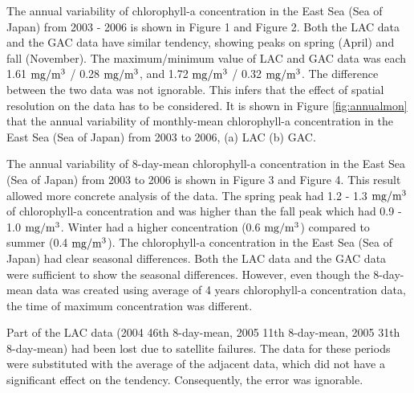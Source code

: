 The annual variability of chlorophyll-a concentration in the East Sea (Sea of Japan) from 2003 - 2006 is shown in Figure 1 and Figure 2. Both the LAC data and the GAC data have similar tendency, showing peaks on spring (April) and fall (November). The maximum/minimum value of LAC and GAC data was each 1.61 $\rm mg/m^3$ / 0.28 $\rm mg/m^3$, and 1.72 $\rm mg/m^3$ / 0.32 $\rm mg/m^3$. The difference between the two data was not ignorable. This infers that the effect of spatial resolution on the data has to be considered.
It is shown in Figure \ref{fig:annualmon} that the annual variability of monthly-mean chlorophyll-a concentration in the East Sea (Sea of Japan) from 2003 to 2006, (a) LAC (b) GAC.

 
 


  
  The annual variability of 8-day-mean chlorophyll-a concentration in the East Sea (Sea of Japan) from 2003 to 2006 is shown in Figure 3 and Figure 4. This result allowed more concrete analysis of the data. The spring peak had 1.2 - 1.3 $\rm mg/m^3$ of chlorophyll-a concentration and was higher than the fall peak which had 0.9 - 1.0 $\rm mg/m^3$. Winter had a higher concentration (0.6 $\rm mg/m^3$) compared to summer (0.4 $\rm mg/m^3$). The chlorophyll-a concentration in the East Sea (Sea of Japan) had clear seasonal differences. Both the LAC data and the GAC data were sufficient to show the seasonal differences. However, even though the 8-day-mean data was created using average of 4 years chlorophyll-a concentration data, the time of maximum concentration was different. 
  
  Part of the LAC data (2004 46th 8-day-mean, 2005 11th 8-day-mean, 2005 31th 8-day-mean) had been lost due to satellite failures. The data for these periods were substituted with the average of the adjacent data, which did not have a significant effect on the tendency. Consequently, the error was ignorable.
 
